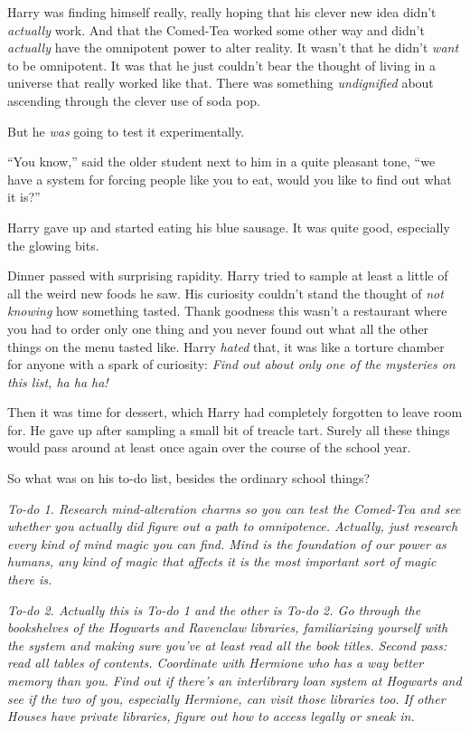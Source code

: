 Harry was finding himself really, really hoping that his clever new idea didn’t \emph{actually} work. And that the Comed-Tea worked some other way and didn’t \emph{actually} have the omnipotent power to alter reality. It wasn’t that he didn’t \emph{want} to be omnipotent. It was that he just couldn’t bear the thought of living in a universe that really worked like that. There was something \emph{undignified} about ascending through the clever use of soda pop.

But he \emph{was} going to test it experimentally.

“You know,” said the older student next to him in a quite pleasant tone, “we have a system for forcing people like you to eat, would you like to find out what it is?”

Harry gave up and started eating his blue sausage. It was quite good, especially the glowing bits.

Dinner passed with surprising rapidity. Harry tried to sample at least a little of all the weird new foods he saw. His curiosity couldn’t stand the thought of \emph{not knowing} how something tasted. Thank goodness this wasn’t a restaurant where you had to order only one thing and you never found out what all the other things on the menu tasted like. Harry \emph{hated} that, it was like a torture chamber for anyone with a spark of curiosity: \emph{Find out about only one of the mysteries on this list, ha ha ha!}

Then it was time for dessert, which Harry had completely forgotten to leave room for. He gave up after sampling a small bit of treacle tart. Surely all these things would pass around at least once again over the course of the school year.

So what was on his to-do list, besides the ordinary school things?

\emph{To-do 1. Research mind-alteration charms so you can test the Comed-Tea and see whether you actually did figure out a path to omnipotence. Actually, just research every kind of mind magic you can find. Mind is the foundation of our power as humans, any kind of magic that affects it is the most important sort of magic there is.}

\emph{To-do 2. Actually this is To-do 1 and the other is To-do 2. Go through the bookshelves of the Hogwarts and Ravenclaw libraries, familiarizing yourself with the system and making sure you’ve at least read all the book titles. Second pass: read all tables of contents. Coordinate with Hermione who has a way better memory than you. Find out if there’s an interlibrary loan system at Hogwarts and see if the two of you, especially Hermione, can visit those libraries too. If other Houses have private libraries, figure out how to access legally or sneak in.}

